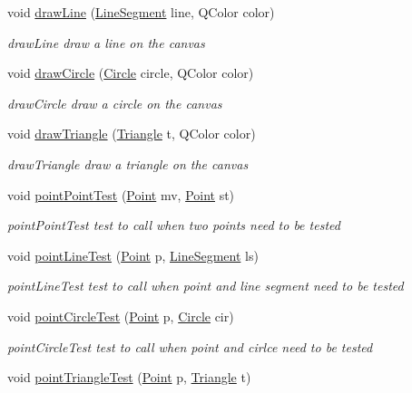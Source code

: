 \begin{DoxyCompactItemize}
void \hyperlink{class_canvas_ae3ad5d92c9a2868b94a6570914b05366}{draw\+Line} (\hyperlink{class_line_segment}{Line\+Segment} line, Q\+Color color)
\begin{DoxyCompactList}\small\item\em draw\+Line draw a line on the canvas \end{DoxyCompactList}\item 
void \hyperlink{class_canvas_ab1413076d90539aea7ac3a06b065afe2}{draw\+Circle} (\hyperlink{class_circle}{Circle} circle, Q\+Color color)
\begin{DoxyCompactList}\small\item\em draw\+Circle draw a circle on the canvas \end{DoxyCompactList}\item 
void \hyperlink{class_canvas_a74dd9cf1e8f3b48e2df2b34886770ac6}{draw\+Triangle} (\hyperlink{class_triangle}{Triangle} t, Q\+Color color)
\begin{DoxyCompactList}\small\item\em draw\+Triangle draw a triangle on the canvas \end{DoxyCompactList}\item 
void \hyperlink{class_canvas_a33b608940212192e7e0ff86c2301c2fe}{point\+Point\+Test} (\hyperlink{class_point}{Point} mv, \hyperlink{class_point}{Point} st)
\begin{DoxyCompactList}\small\item\em point\+Point\+Test test to call when two points need to be tested \end{DoxyCompactList}\item 
void \hyperlink{class_canvas_ad5681f0cada49f0453158155b42c2fb7}{point\+Line\+Test} (\hyperlink{class_point}{Point} p, \hyperlink{class_line_segment}{Line\+Segment} ls)
\begin{DoxyCompactList}\small\item\em point\+Line\+Test test to call when point and line segment need to be tested \end{DoxyCompactList}\item 
void \hyperlink{class_canvas_a407d5fea40a48519ab368d39739943c4}{point\+Circle\+Test} (\hyperlink{class_point}{Point} p, \hyperlink{class_circle}{Circle} cir)
\begin{DoxyCompactList}\small\item\em point\+Circle\+Test test to call when point and cirlce need to be tested \end{DoxyCompactList}\item 
void \hyperlink{class_canvas_a8c35a24d67af6d8a76be14321c08b7cb}{point\+Triangle\+Test} (\hyperlink{class_point}{Point} p, \hyperlink{class_triangle}{Triangle} t)

\end{DoxyCompactItemize}

